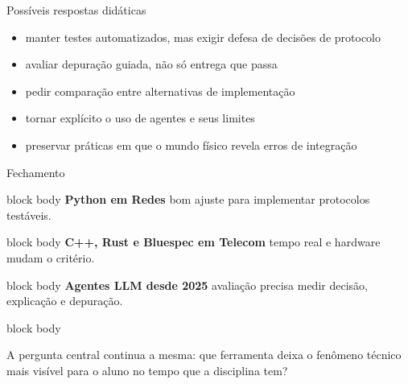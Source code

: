\documentclass[aspectratio=169,11pt]{beamer}
\newcommand{\callout}[1]{%
  \begin{beamercolorbox}[wd=\linewidth,sep=0.7em,rounded=true]{block body}
    #1
  \end{beamercolorbox}
}
\newenvironment{tightitemize}{%
  \begin{itemize}\setlength{\itemsep}{0.25em}\setlength{\parskip}{0pt}
}{\end{itemize}}
\begin{document}
\begin{frame}{Possíveis respostas didáticas}
  \begin{tightitemize}
    \item manter testes automatizados, mas exigir defesa de decisões de protocolo
    \item avaliar depuração guiada, não só entrega que passa
    \item pedir comparação entre alternativas de implementação
    \item tornar explícito o uso de agentes e seus limites
    \item preservar práticas em que o mundo físico revela erros de integração
  \end{tightitemize}
\end{frame}

\begin{frame}{Fechamento}
  \begin{beamercolorbox}[wd=\linewidth,sep=0.55em,rounded=true]{block body}
    {\color{caipyraRed}\bfseries Python em Redes}\quad
    bom ajuste para implementar protocolos testáveis.
  \end{beamercolorbox}

  \vspace{0.55em}
  \begin{beamercolorbox}[wd=\linewidth,sep=0.55em,rounded=true]{block body}
    {\color{caipyraOrange}\bfseries C++, Rust e Bluespec em Telecom}\quad
    tempo real e hardware mudam o critério.
  \end{beamercolorbox}

  \vspace{0.55em}
  \begin{beamercolorbox}[wd=\linewidth,sep=0.55em,rounded=true]{block body}
    {\color{caipyraWine}\bfseries Agentes LLM desde 2025}\quad
    avaliação precisa medir decisão, explicação e depuração.
  \end{beamercolorbox}

  \vspace{1.5em}
  \callout{
    A pergunta central continua a mesma: que ferramenta deixa o fenômeno técnico
    mais visível para o aluno no tempo que a disciplina tem?
  }
\end{frame}
\end{document}
